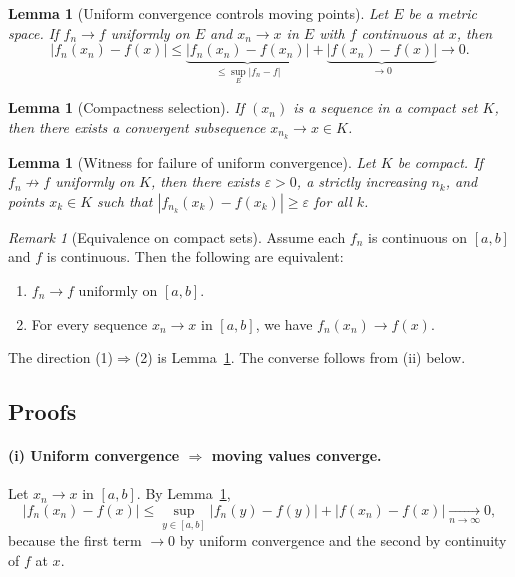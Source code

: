 \documentclass[12pt,a4paper]{article}
\theoremstyle{plain}
\newtheorem{lemma}[theorem]{Lemma}
\theoremstyle{definition}
\theoremstyle{remark}
\newtheorem*{remark}{Remark} %
\theoremstyle{remark}
\begin{document}
\begin{lemma}[Uniform convergence controls moving points]\label{lem:move}
	Let $E$ be a metric space. If $f_n\to f$ uniformly on $E$ and $x_n\to x$ in $E$ with $f$ continuous at $x$, then
	\[
	|f_n(x_n)-f(x)| \le \underbrace{|f_n(x_n)-f(x_n)|}_{\le \sup_E |f_n-f|} + \underbrace{|f(x_n)-f(x)|}_{\to 0}
	\longrightarrow 0.
	\]
\end{lemma}

\begin{lemma}[Compactness selection]\label{lem:compact}
	If $(x_n)$ is a sequence in a compact set $K$, then there exists a convergent subsequence $x_{n_k}\to x\in K$.
\end{lemma}

\begin{lemma}[Witness for failure of uniform convergence]\label{lem:witness}
	Let $K$ be compact. If $f_n \not\to f$ uniformly on $K$, then there exists $\varepsilon>0$, a strictly increasing $n_k$,
	and points $x_k\in K$ such that $|f_{n_k}(x_k)-f(x_k)|\ge \varepsilon$ for all $k$.
\end{lemma}

\begin{remark}[Equivalence on compact sets]\label{rem:equiv}
	Assume each $f_n$ is continuous on $[a,b]$ and $f$ is continuous. Then the following are equivalent:
	\begin{enumerate}
		\item $f_n \to f$ uniformly on $[a,b]$.
		\item For every sequence $x_n\to x$ in $[a,b]$, we have $f_n(x_n)\to f(x)$.
	\end{enumerate}
	The direction (1)$\Rightarrow$(2) is Lemma~\ref{lem:move}. The converse follows from (ii) below.
\end{remark}

\subsection*{Proofs}

\paragraph{(i) Uniform convergence $\Rightarrow$ moving values converge.}
Let $x_n\to x$ in $[a,b]$. By Lemma~\ref{lem:move},
\[
|f_n(x_n)-f(x)| \le \sup_{y\in[a,b]}|f_n(y)-f(y)| + |f(x_n)-f(x)| \xrightarrow[n\to\infty]{} 0,
\]
because the first term $\to 0$ by uniform convergence and the second by continuity of $f$ at $x$.
\end{document}
